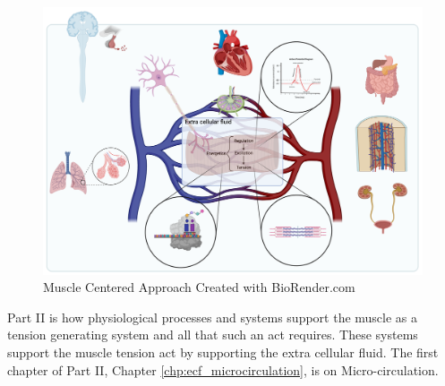 \begin{figure}[!h]
    \centering
    \includegraphics[width=1\linewidth]{./figure/Course_Graphic.png}
    \caption{Muscle Centered Approach \footnotesize{Created with BioRender.com}}
    \label{fig:course_graphic}
\end{figure}

Part II is how physiological processes and systems support the muscle as a tension generating system and all that such an act requires. These systems support the muscle tension act by supporting the extra cellular fluid. The first chapter of Part II, Chapter \ref{chp:ecf_microcirculation}, is on Micro-circulation. 

\printbibliography[heading=subbibintoc]